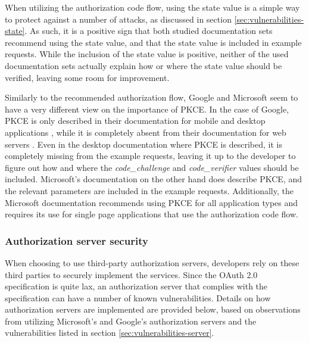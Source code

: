 When utilizing the authorization code flow, using the state value is a simple way to protect against a number of attacks, as discussed in section \ref{sec:vulnerabilities-state}.
As such, it is a positive sign that both studied documentation sets recommend using the state value, and that the state value is included in example requests.
While the inclusion of the state value is positive, neither of the used documentation sets actually explain how or where the state value should be verified, leaving some room for improvement.

Similarly to the recommended authorization flow, Google and Microsoft seem to have a very different view on the importance of PKCE.
In the case of Google, PKCE is only described in their documentation for mobile and desktop applications \citep{noauthor_oauth_desktop}, while it is completely absent from their documentation for web servers \citep{noauthor_oauth_server}.
Even in the desktop documentation where PKCE is described, it is completely missing from the example requests, leaving it up to the developer to figure out how and where the \textit{code\_challenge} and \textit{code\_verifier} values should be included.
Microsoft's documentation on the other hand does describe PKCE, and the relevant parameters are included in the example requests.
Additionally, the Microsoft documentation recommends using PKCE for all application types and requires its use for single page applications that use the authorization code flow.

\subsubsection{Authorization server security}
\label{sec:discussion-server-security}
When choosing to use third-party authorization servers, developers rely on these third parties to securely implement the services.
Since the OAuth 2.0 specification is quite lax, an authorization server that complies with the specification can have a number of known vulnerabilities.
Details on how authorization servers are implemented are provided below, based on observations from utilizing Microsoft's and Google's authorization servers and the vulnerabilities listed in section \ref{sec:vulnerabilities-server}.

